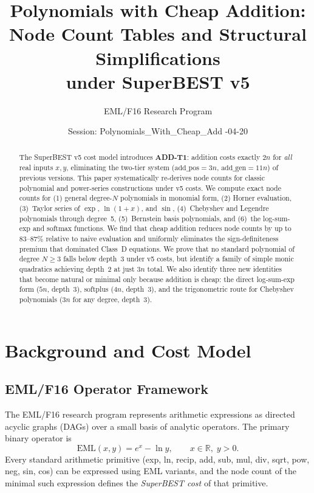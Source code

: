 \documentclass[11pt,a4paper]{article}
\title{\textbf{Polynomials with Cheap Addition: \\
       Node Count Tables and Structural Simplifications \\
       under SuperBEST v5}}
\author{EML/F16 Research Program}
\date{Session: Polynomials\_With\_Cheap\_Add \quad 2026-04-20}
\begin{document}
\maketitle

\begin{abstract}
The SuperBEST v5 cost model introduces \textbf{ADD-T1}: addition costs exactly $2n$ for
\emph{all} real inputs $x, y$, eliminating the two-tier system ($\text{add\_pos}=3n$,
$\text{add\_gen}=11n$) of previous versions. This paper systematically re-derives node
counts for classic polynomial and power-series constructions under v5 costs. We compute
exact node counts for (1) general degree-$N$ polynomials in monomial form, (2) Horner
evaluation, (3)~Taylor series of $\exp$, $\ln(1+x)$, and $\sin$, (4)~Chebyshev and
Legendre polynomials through degree~5, (5)~Bernstein basis polynomials, and (6)~the
log-sum-exp and softmax functions. We find that cheap addition reduces node counts by
up to 83--87\% relative to naive evaluation and uniformly eliminates the sign-definiteness
premium that dominated Class~D equations. We prove that no standard polynomial of
degree $N \geq 3$ falls below depth~3 under v5 costs, but identify a family of simple
monic quadratics achieving depth~2 at just $3n$ total. We also identify three new
identities that become natural or minimal only because addition is cheap:
the direct log-sum-exp form ($5n$, depth~3), softplus ($4n$, depth~3), and the
trigonometric route for Chebyshev polynomials ($3n$ for any degree, depth~3).
\end{abstract}

\tableofcontents

\section{Background and Cost Model}

\subsection{EML/F16 Operator Framework}

The EML/F16 research program represents arithmetic expressions as directed acyclic graphs
(DAGs) over a small basis of analytic operators. The primary binary operator is
\[
  \mathrm{EML}(x, y) = e^x - \ln y, \qquad x \in \mathbb{R},\; y > 0.
\]
Every standard arithmetic primitive (exp, ln, recip, add, sub, mul, div, sqrt, pow, neg,
sin, cos) can be expressed using EML variants, and the node count of the minimal such
expression defines the \emph{SuperBEST cost} of that primitive.
\end{document}
